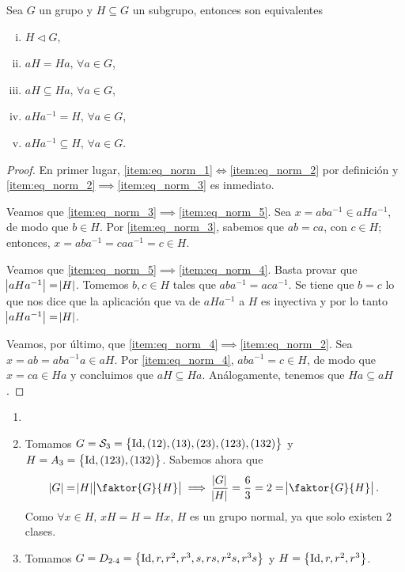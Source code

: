 \begin{prop}
    Sea $G$ un grupo y $H \subseteq G$ un subgrupo, entonces son equivalentes
    \begin{enumerate}[(i)]
        \item\label{item:eq_norm_1} $H \triangleleft G$,
        \item\label{item:eq_norm_2} $aH = Ha, \, \forall a \in G$,
        \item\label{item:eq_norm_3} $aH \subseteq Ha, \, \forall a \in G$,
        \item\label{item:eq_norm_4} $aHa^{-1} = H, \, \forall a \in G$,
        \item\label{item:eq_norm_5} $aHa^{-1} \subseteq H, \, \forall a \in G$.
    \end{enumerate}
\end{prop}

\begin{proof}
    En primer lugar, \ref{item:eq_norm_1}$\iff$\ref{item:eq_norm_2} por definición y \ref{item:eq_norm_2}$\implies$\ref{item:eq_norm_3} es inmediato.
    
    \noindent Veamos que \ref{item:eq_norm_3}$\implies$\ref{item:eq_norm_5}. Sea $x=aba^{-1}\in aHa^{-1}$, de modo que $b\in H$. Por \ref{item:eq_norm_3}, sabemos que $ab=ca$, con $c\in H$; entonces, $x=aba^{-1}=caa^{-1}=c\in H$.
    
    \noindent Veamos que \ref{item:eq_norm_5}$\implies$\ref{item:eq_norm_4}. Basta provar que $\abs{aHa^{-1}}=\abs{H}$. Tomemos $b, c\in H$ tales que $aba^{-1}=aca^{-1}$. Se tiene que $b=c$ lo que nos dice que la aplicación que va de $aHa^{-1}$ a $H$ es inyectiva y por lo tanto $\abs{aHa^{-1}}=\abs{H}$.
    
    \noindent Veamos, por último, que \ref{item:eq_norm_4}$\implies$\ref{item:eq_norm_2}. Sea $x=ab=aba^{-1}a\in aH$. Por \ref{item:eq_norm_4}, $aba^{-1}=c\in H$, de modo que $x=ca\in Ha$ y concluimos que $aH\subseteq Ha$. Análogamente, tenemos que $Ha\subseteq aH$.
\end{proof}

\begin{example}
    \begin{enumerate}[1.]
        \item[]
        \item Tomamos $G = \mathcal{S}_3 = \left\{\operatorname{Id}, (12), (13), (23), (123), (132)\right\}$ y
            $H = A_3 = \left\{\operatorname{Id}, (123), (132)\right\}$. Sabemos ahora que
            \[
                \abs{G} = \abs{H}\abs{\faktor{G}{H}} \implies
                \frac{\abs{G}}{\abs{H}} = \frac{6}{3} = 2 = \abs{\faktor{G}{H}}.
            \]
            Como $\forall x \in H, \, xH = H = Hx$, $H$ es un grupo normal, ya que solo existen 2 clases.
        \item Tomamos $G = D_{2 \cdot 4} = \left\{\operatorname{Id}, r, r^2, r^3, s, rs, r^2s, r^3s\right\}$ y
            $H = \left\{ \operatorname{Id}, r, r^2, r^3\right\}$. %
    \end{enumerate}
\end{example}

